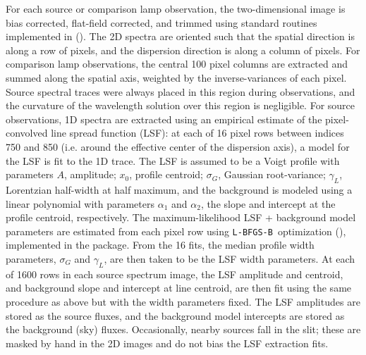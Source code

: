 \documentclass[modern, letterpaper]{aastex61}
\newcommand{\lbfgsb}{\texttt{L-BFGS-B}}
\begin{document}
For each source or comparison lamp observation, the two-dimensional image is
bias corrected, flat-field corrected, and trimmed using standard routines
implemented in  (\citealt{Craig:2015}).
The 2D spectra are oriented such that the spatial direction is along a row of
pixels, and the dispersion direction is along a column of pixels.
For comparison lamp observations, the central 100 pixel columns are extracted
and summed along the spatial axis, weighted by the inverse-variances of each
pixel.
Source spectral traces were always placed in this region during observations,
and the curvature of the wavelength solution over this region is negligible.
For source observations, 1D spectra are extracted using an empirical
estimate of the pixel-convolved line spread function (LSF): at each of 16 pixel
rows between indices 750 and 850 (i.e. around the effective center of the
dispersion axis), a model for the LSF is fit to the 1D trace.
The LSF is assumed to be a Voigt profile with parameters $A$, amplitude; $x_0$,
profile centroid; $\sigma_G$, Gaussian root-variance; $\gamma_L$, Lorentzian
half-width at half maximum, and the background is modeled using a linear
polynomial with parameters $\alpha_1$ and $\alpha_2$, the slope and intercept
at the profile centroid, respectively.
The maximum-likelihood LSF + background model parameters are estimated from
each pixel row using \lbfgsb\ optimization (\citealt{Zhu:1994}), implemented in
the  package.
From the 16 fits, the median profile width parameters, $\sigma_G$ and
$\gamma_L$, are then taken to be the LSF width parameters.
At each of 1600 rows in each source spectrum image, the LSF amplitude and
centroid, and background slope and intercept at line centroid, are then fit
using the same procedure as above but with the width parameters fixed.
The LSF amplitudes are stored as the source fluxes, and the background model
intercepts are stored as the background (sky) fluxes.
Occasionally, nearby sources fall in the slit; these are masked by hand in the
2D images and do not bias the LSF extraction fits.
\end{document}
